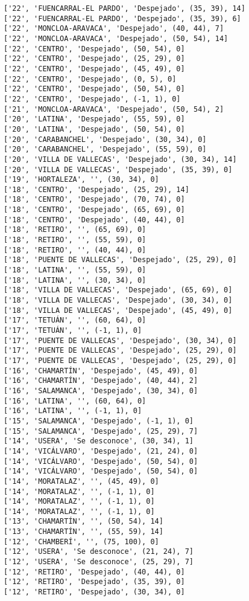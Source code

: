 \documentclass[11pt]{article}
\begin{document}
\begin{Verbatim}[commandchars=\\\{\}]
['22', 'FUENCARRAL-EL PARDO', 'Despejado', (35, 39), 14]
['22', 'FUENCARRAL-EL PARDO', 'Despejado', (35, 39), 6]
['22', 'MONCLOA-ARAVACA', 'Despejado', (40, 44), 7]
['22', 'MONCLOA-ARAVACA', 'Despejado', (50, 54), 14]
['22', 'CENTRO', 'Despejado', (50, 54), 0]
['22', 'CENTRO', 'Despejado', (25, 29), 0]
['22', 'CENTRO', 'Despejado', (45, 49), 0]
['22', 'CENTRO', 'Despejado', (0, 5), 0]
['22', 'CENTRO', 'Despejado', (50, 54), 0]
['22', 'CENTRO', 'Despejado', (-1, 1), 0]
['21', 'MONCLOA-ARAVACA', 'Despejado', (50, 54), 2]
['20', 'LATINA', 'Despejado', (55, 59), 0]
['20', 'LATINA', 'Despejado', (50, 54), 0]
['20', 'CARABANCHEL', 'Despejado', (30, 34), 0]
['20', 'CARABANCHEL', 'Despejado', (55, 59), 0]
['20', 'VILLA DE VALLECAS', 'Despejado', (30, 34), 14]
['20', 'VILLA DE VALLECAS', 'Despejado', (35, 39), 0]
['19', 'HORTALEZA', '', (30, 34), 0]
['18', 'CENTRO', 'Despejado', (25, 29), 14]
['18', 'CENTRO', 'Despejado', (70, 74), 0]
['18', 'CENTRO', 'Despejado', (65, 69), 0]
['18', 'CENTRO', 'Despejado', (40, 44), 0]
['18', 'RETIRO', '', (65, 69), 0]
['18', 'RETIRO', '', (55, 59), 0]
['18', 'RETIRO', '', (40, 44), 0]
['18', 'PUENTE DE VALLECAS', 'Despejado', (25, 29), 0]
['18', 'LATINA', '', (55, 59), 0]
['18', 'LATINA', '', (30, 34), 0]
['18', 'VILLA DE VALLECAS', 'Despejado', (65, 69), 0]
['18', 'VILLA DE VALLECAS', 'Despejado', (30, 34), 0]
['18', 'VILLA DE VALLECAS', 'Despejado', (45, 49), 0]
['17', 'TETUÁN', '', (60, 64), 0]
['17', 'TETUÁN', '', (-1, 1), 0]
['17', 'PUENTE DE VALLECAS', 'Despejado', (30, 34), 0]
['17', 'PUENTE DE VALLECAS', 'Despejado', (25, 29), 0]
['17', 'PUENTE DE VALLECAS', 'Despejado', (25, 29), 0]
['16', 'CHAMARTÍN', 'Despejado', (45, 49), 0]
['16', 'CHAMARTÍN', 'Despejado', (40, 44), 2]
['16', 'SALAMANCA', 'Despejado', (30, 34), 0]
['16', 'LATINA', '', (60, 64), 0]
['16', 'LATINA', '', (-1, 1), 0]
['15', 'SALAMANCA', 'Despejado', (-1, 1), 0]
['15', 'SALAMANCA', 'Despejado', (25, 29), 7]
['14', 'USERA', 'Se desconoce', (30, 34), 1]
['14', 'VICÁLVARO', 'Despejado', (21, 24), 0]
['14', 'VICÁLVARO', 'Despejado', (50, 54), 0]
['14', 'VICÁLVARO', 'Despejado', (50, 54), 0]
['14', 'MORATALAZ', '', (45, 49), 0]
['14', 'MORATALAZ', '', (-1, 1), 0]
['14', 'MORATALAZ', '', (-1, 1), 0]
['14', 'MORATALAZ', '', (-1, 1), 0]
['13', 'CHAMARTÍN', '', (50, 54), 14]
['13', 'CHAMARTÍN', '', (55, 59), 14]
['12', 'CHAMBERÍ', '', (75, 100), 0]
['12', 'USERA', 'Se desconoce', (21, 24), 7]
['12', 'USERA', 'Se desconoce', (25, 29), 7]
['12', 'RETIRO', 'Despejado', (40, 44), 0]
['12', 'RETIRO', 'Despejado', (35, 39), 0]
['12', 'RETIRO', 'Despejado', (30, 34), 0]

\end{Verbatim}
\end{document}
